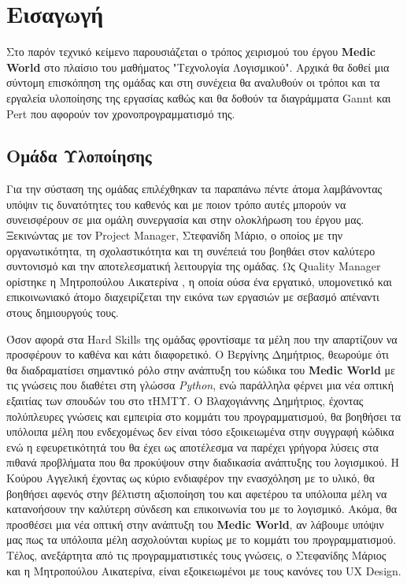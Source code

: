\documentclass{article}
\begin{document}
{
  \hypersetup{linkcolor=black}
  \tableofcontents
}

\section{Εισαγωγή}
   
Στο παρόν τεχνικό κείμενο παρουσιάζεται ο τρόπος χειρισμού του έργου \textbf{Medic World} στο πλαίσιο του μαθήματος "Τεχνολογία Λογισμικού". Αρχικά θα δοθεί μια σύντομη επισκόπηση της ομάδας και στη συνέχεια θα αναλυθούν οι τρόποι και τα εργαλεία υλοποίησης της εργασίας καθώς και θα δοθούν τα διαγράμματα Gannt και Pert που αφορούν τον χρονοπρογραμματισμό της. 
 
 
\subsection{Ομάδα Υλοποίησης}

Για την σύσταση της ομάδας επιλέχθηκαν τα παραπάνω πέντε άτομα λαμβάνοντας υπόψιν τις δυνατότητες του καθενός και με ποιον τρόπο αυτές μπορούν να συνεισφέρουν σε μια ομάλη συνεργασία και στην ολοκλήρωση του έργου μας. Ξεκινώντας με τον Project Manager, Στεφανίδη Μάριο, ο οποίος με την οργανωτικότητα, τη σχολαστικότητα και τη συνέπειά του βοηθάει στον καλύτερο συντονισμό και την αποτελεσματική λειτουργία της ομάδας. Ως Quality Manager ορίστηκε η Μητροπούλου Αικατερίνα , η οποία ούσα ένα εργατικό, υπομονετικό και επικοινωνιακό άτομο διαχειρίζεται την εικόνα των εργασιών με σεβασμό απέναντι στους δημιουργούς τους.
\newline \par

Όσον αφορά στα Hard Skills της ομάδας φροντίσαμε τα μέλη που την απαρτίζουν να προσφέρουν το καθένα και κάτι διαφορετικό. Ο Βεργίνης Δημήτριος, θεωρούμε ότι θα διαδραματίσει σημαντικό ρόλο στην ανάπτυξη του κώδικα του \textbf{Medic World} με τις γνώσεις που διαθέτει στη γλώσσα \emph{Python}, ενώ παράλληλα φέρνει μια νέα οπτική εξαιτίας των σπουδών του στο τΗΜΤΥ. Ο Βλαχογιάννης Δημήτριος, έχοντας πολύπλευρες γνώσεις και εμπειρία στο κομμάτι του προγραμματισμού, θα βοηθήσει τα υπόλοιπα μέλη  που ενδεχομένως δεν είναι τόσο εξοικειωμένα στην συγγραφή κώδικα ενώ η εφευρετικότητά του θα έχει ως αποτέλεσμα να παρέχει γρήγορα λύσεις στα πιθανά προβλήματα που θα προκύψουν στην διαδικασία ανάπτυξης του λογισμικού. Η Κούρου Αγγελική έχοντας ως κύριο ενδιαφέρον την ενασχόληση με το υλικό, θα βοηθήσει αφενός στην βέλτιστη αξιοποίηση του και αφετέρου τα υπόλοιπα μέλη να κατανοήσουν την καλύτερη σύνδεση και επικοινωνία του με το λογισμικό. Ακόμα, θα προσθέσει μια νέα οπτική στην ανάπτυξη του \textbf{Medic World}, αν λάβουμε υπόψιν μας πως τα υπόλοιπα μέλη ασχολούνται κυρίως με το κομμάτι του προγραμματισμού. Τέλος, ανεξάρτητα από τις προγραμματιστικές τους γνώσεις, ο Στεφανίδης Μάριος και η Μητροπούλου Αικατερίνα, είναι εξοικειωμένοι με τους κανόνες του UX Design.
\end{document}
